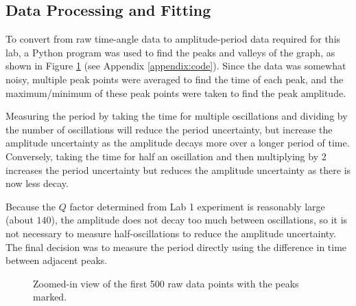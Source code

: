 \documentclass[aps,twocolumn,secnumarabic,nobalancelastpage,amsmath,amssymb,nofootinbib,floatfix,letterpaper]{revtex4}
\begin{document}
\subsection{Data Processing and Fitting}

To convert from raw time-angle data to amplitude-period data required for this lab, a Python program was used to find
the peaks and valleys of the graph, as shown in Figure \ref{fig:rawdata} (see Appendix \ref{appendix:code}).
Since the data was somewhat noisy, multiple peak points were averaged to find the time of each peak, and the
maximum/minimum of these peak points were taken to find the peak amplitude.

Measuring the period by taking the time for multiple oscillations and dividing by the number of oscillations will reduce
the period uncertainty, but increase the amplitude uncertainty as the amplitude decays more over a longer period of
time. Conversely, taking the time for half an oscillation and then multiplying by 2 increases the period uncertainty but
reduces the amplitude uncertainty as there is now less decay.

Because the $Q$ factor determined from Lab 1 experiment is reasonably large (about $140$), the amplitude does not decay
too much between oscillations, so it is not necessary to measure half-oscillations to reduce the amplitude uncertainty.
The final decision was to measure the period directly using the difference in time between adjacent peaks.

\begin{figure}[htb]
    \caption{Zoomed-in view of the first 500 raw data points with the peaks marked.}
    \label{fig:rawdata}
\end{figure}
\end{document}
